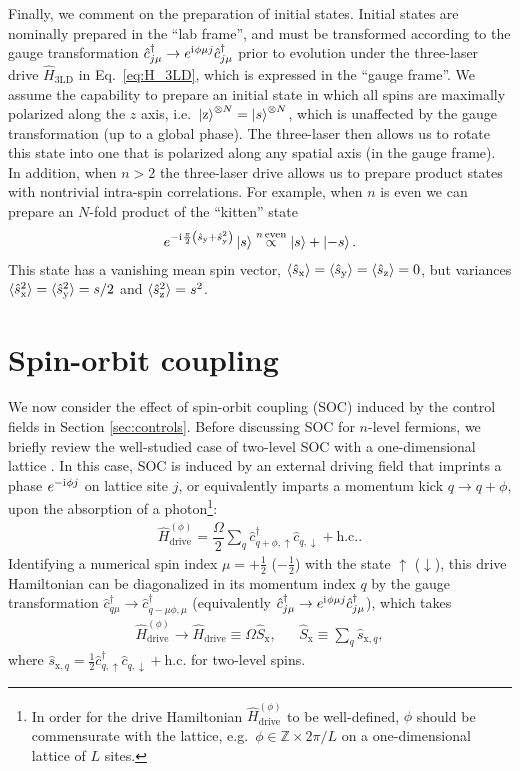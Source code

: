 \documentclass[aps,pra,nofootinbib,twocolumn,superscriptaddress]{revtex4-2}
\renewcommand{\t}{\text} %
\newcommand{\f}[2]{\dfrac{#1}{#2}} %
\newcommand{\p}[1]{\left(#1\right)} %
\newcommand{\bk}{\braket} %
\renewcommand{\i}{\mathrm{i}\mkern1mu} %
\newcommand{\1}{\mathds{1}}
\renewcommand{\c}{\hat c}
\newcommand{\s}{\hat s}
\renewcommand{\H}{\hat H}
\renewcommand{\S}{\hat S}
\newcommand{\up}{\uparrow}
\newcommand{\dn}{\downarrow}
\newcommand{\x}{\text{x}}
\newcommand{\y}{\text{y}}
\newcommand{\z}{\text{z}}
\newcommand{\ZZ}{\mathbb{Z}}
\begin{document}
Finally, we comment on the preparation of initial states.
Initial states are nominally prepared in the ``lab frame'', and must be transformed according to the gauge transformation $\c_{j\mu}^\dag\to e^{\i\phi\mu j} \c_{j\mu}^\dag$ prior to evolution under the three-laser drive $\H_{\t{3LD}}$ in Eq.~\eqref{eq:H_3LD}, which is expressed in the ``gauge frame''.
We assume the capability to prepare an initial state in which all spins are maximally polarized along the $z$ axis, i.e.~$\ket{\z}^{\otimes N}=\ket{s}^{\otimes N}$, which is unaffected by the gauge transformation (up to a global phase).
The three-laser then allows us to rotate this state into one that is polarized along any spatial axis (in the gauge frame).
In addition, when $n>2$ the three-laser drive allows us to prepare product states with nontrivial intra-spin correlations.
For example, when $n$ is even we can prepare an $N$-fold product of the ``kitten'' state
\begin{align}
  e^{-\i\frac{\pi}{2}\p{\s_\y + \s_\y^2}} \ket{s}
  \stackrel{n\,\t{even}}{\propto} \ket{s} + \ket{-s}.
\end{align}
This state has a vanishing mean spin vector, $\bk{\s_\x}=\bk{\s_\y}=\bk{\s_\z}=0$, but variances $\bk{\s_\x^2}=\bk{\s_\y^2}=s/2$ and $\bk{\s_\z^2}=s^2$.

\section{Spin-orbit coupling}
\label{sec:SOC}

We now consider the effect of spin-orbit coupling (SOC) induced by the control fields in Section \ref{sec:controls}.
Before discussing SOC for $n$-level fermions, we briefly review the well-studied case of two-level SOC with a one-dimensional lattice \cite{wall2016synthetic, kolkowitz2016spinorbitcoupled, bromley2018dynamics, he2019engineering}.
In this case, SOC is induced by an external driving field that imprints a phase $e^{-\i\phi j}$ on lattice site $j$, or equivalently imparts a momentum kick $q\to q+\phi$, upon the absorption of a photon\footnote{In order for the drive Hamiltonian $\H_{\t{drive}}^{(\phi)}$ to be well-defined, $\phi$ should be commensurate with the lattice, e.g.~$\phi\in\ZZ\times2\pi/L$ on a one-dimensional lattice of $L$ sites.}:
\begin{align}
  \H_{\t{drive}}^{(\phi)}
  = \f{\Omega}{2} \sum_q \c_{q+\phi,\up}^\dag \c_{q,\dn} + \t{h.c.}.
  \label{eq:drive_2}
\end{align}
Identifying a numerical spin index $\mu=+\frac12$ ($-\frac12$) with the state $\up$ ($\dn$), this drive Hamiltonian can be diagonalized in its momentum index $q$ by the gauge transformation $\c_{q\mu}^\dag\to \c_{q-\mu\phi,\mu}^\dag$ (equivalently $\c_{j\mu}^\dag\to e^{\i\phi\mu j} \c_{j\mu}^\dag$), which takes
\begin{align}
  \H_{\t{drive}}^{(\phi)} \to \H_{\t{drive}} \equiv \Omega \S_\x,
  &&
  \S_\x \equiv \sum_q \s_{\x,q},
  \label{eq:drive_trans}
\end{align}
where $\s_{\x,q}=\frac12 \c_{q,\up}^\dag \c_{q,\dn} + \t{h.c.}$ for two-level spins.
\end{document}
